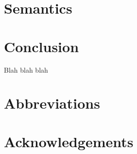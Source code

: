 \section{Semantics}

\section{Conclusion}

Blah blah blah

 
\section*{Abbreviations}
\section*{Acknowledgements}

\printbibliography[heading=subbibliography,notkeyword=this] 

